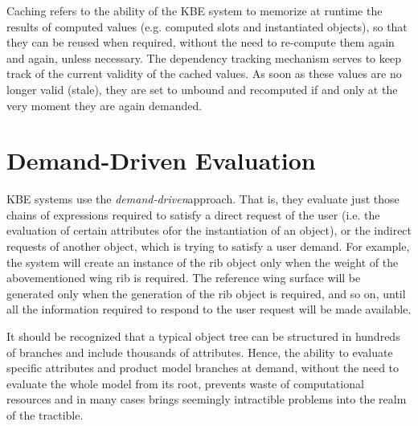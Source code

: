 \documentclass [11pt]{book}
\begin{document}
\label{sec:classiccachingfeature}



Caching refers to the ability of the KBE system to memorize at
runtime the results of computed values (e.g. computed slots and
instantiated objects), so that they can be reused when required,
without the need to re-compute them again and again, unless necessary.
The dependency tracking mechanism serves to keep track of the current
validity of the cached values.  As soon as these values are no longer
valid (stale), they are set to unbound and recomputed if and only at
the very moment they are again demanded.



\section{Demand-Driven Evaluation}

\label{sec:demand-drivenevaluation}

KBE systems use the \emph{demand-driven}approach. That is, they evaluate just those chains of
expressions required to satisfy a direct request of the user (i.e. the
evaluation of certain attributes ofor the instantiation of an object),
or the indirect requests of another object, which is trying to satisfy
a user demand. For example, the system will create an instance of the
rib object only when the weight of the abovementioned wing rib is
required. The reference wing surface will be generated only when the
generation of the rib object is required, and so on, until all the
information required to respond to the user request will be made
available.

It should be recognized that a typical object tree can be structured
in hundreds of branches and include thousands of attributes. Hence,
the ability to evaluate specific attributes and product model branches
at demand, without the need to evaluate the whole model from its root,
prevents waste of computational resources and in many cases brings
seemingly intractible problems into the realm of the tractible.
\end{document}
